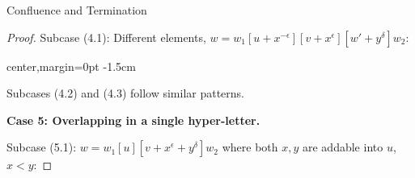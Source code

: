\documentclass{article}
\theoremstyle{definition}
\theoremstyle{remark}
\theoremstyle{theorem}
\theoremstyle{definition}
\begin{document}
\begin{section}{Confluence and Termination}
\begin{proof}
Subcase (4.1): Different elements, $w = w_1[u+x^{-\epsilon}][v+x^\epsilon][w'+y^\delta]w_2$:
\vspace{40pt}
\begin{center}
\begin{adjustbox}{center,margin=0pt -1.5cm}
\end{adjustbox}
\end{center}
\vspace{40pt}

Subcases (4.2) and (4.3) follow similar patterns.

\textbf{Case 5: Overlapping in a single hyper-letter.}

Subcase (5.1): $w = w_1[u][v+x^{\epsilon}+y^{\delta}]w_2$ where both $x,y$ are addable into $u$, $x < y$:


\end{proof}
\end{section}
\end{document}
